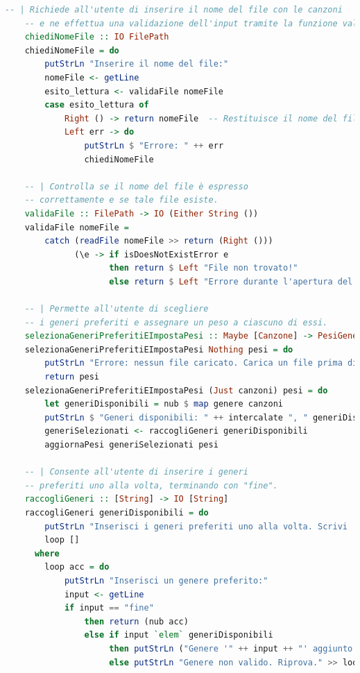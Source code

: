 \documentclass[a4paper,11pt]{article}
\begin{document}
\begin{lstlisting}[language=Haskell]
    -- | Richiede all'utente di inserire il nome del file con le canzoni
    -- e ne effettua una validazione dell'input tramite la funzione validaFile.
    chiediNomeFile :: IO FilePath
    chiediNomeFile = do
        putStrLn "Inserire il nome del file:"
        nomeFile <- getLine
        esito_lettura <- validaFile nomeFile
        case esito_lettura of
            Right () -> return nomeFile  -- Restituisce il nome del file se valido
            Left err -> do
                putStrLn $ "Errore: " ++ err
                chiediNomeFile
    
    -- | Controlla se il nome del file è espresso
    -- correttamente e se tale file esiste.
    validaFile :: FilePath -> IO (Either String ())
    validaFile nomeFile =
        catch (readFile nomeFile >> return (Right ()))
              (\e -> if isDoesNotExistError e
                     then return $ Left "File non trovato!"
                     else return $ Left "Errore durante l'apertura del file.")
    
    -- | Permette all'utente di scegliere
    -- i generi preferiti e assegnare un peso a ciascuno di essi.
    selezionaGeneriPreferitiEImpostaPesi :: Maybe [Canzone] -> PesiGeneri -> IO PesiGeneri
    selezionaGeneriPreferitiEImpostaPesi Nothing pesi = do
        putStrLn "Errore: nessun file caricato. Carica un file prima di continuare."
        return pesi
    selezionaGeneriPreferitiEImpostaPesi (Just canzoni) pesi = do
        let generiDisponibili = nub $ map genere canzoni
        putStrLn $ "Generi disponibili: " ++ intercalate ", " generiDisponibili
        generiSelezionati <- raccogliGeneri generiDisponibili
        aggiornaPesi generiSelezionati pesi
    
    -- | Consente all'utente di inserire i generi
    -- preferiti uno alla volta, terminando con "fine".
    raccogliGeneri :: [String] -> IO [String]
    raccogliGeneri generiDisponibili = do
        putStrLn "Inserisci i generi preferiti uno alla volta. Scrivi 'fine' per terminare."
        loop []
      where
        loop acc = do
            putStrLn "Inserisci un genere preferito:"
            input <- getLine
            if input == "fine"
                then return (nub acc)
                else if input `elem` generiDisponibili
                     then putStrLn ("Genere '" ++ input ++ "' aggiunto ai preferiti.") >> loop (input : acc)
                     else putStrLn "Genere non valido. Riprova." >> loop acc
    

\end{lstlisting}
\end{document}
